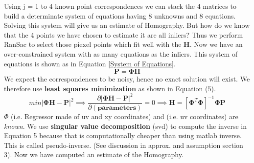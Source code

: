 \documentclass[titlepage]{article}
\begin{document}
Using j = 1 to 4 known point correspondences we can stack the 4 matrices to build a determinate system of equations having 8 unknowns and 8 equations. Solving this system will give us an estimate of Homography. But how do we know that the 4 points we have chosen to estimate it are all inliers? Thus we perform RanSac to select those piexel points which fit well with the \textbf{H}. Now we have an over-constrained system with as many equations as the inliers. This system of equations is shown as in Equation \ref{System of Equations}. 
%
\begin{equation}
    \label{System of Equations}
    \mathbf{P} =  \mathbf{\Phi} \mathbf{H}
    \end{equation}
We expect the correspondences to be noisy, hence no exact solution will exist. We therefore use \textbf{least squares minimization} as shown in Equation (5).
\begin{equation}
\label{Least Squares}
min |\mathbf{\Phi} \mathbf{H} - \mathbf{P}|^2 \implies \frac{\partial {|\mathbf{\Phi} \mathbf{H} - \mathbf{P}|^2}}{\partial\mathbf{(parameters)}} = 0 \implies \mathbf{H} = [\mathbf{\Phi}^T \mathbf{\Phi}]^{-1} \mathbf{\Phi} \mathbf{P}
\end{equation}
$\Phi$ (i.e. Regressor made of uv and xy coordinates) and  (i.e. uv coordinates) are \textit{known}. We use \textbf{singular value decomposition} (svd) to compute the inverse in Equation 5 because that is computationally cheaper than using matlab inverse. This is called pseudo-inverse. (See discussion in approx. and assumption section 3). Now we have computed an estimate of the Homography.
\end{document}
